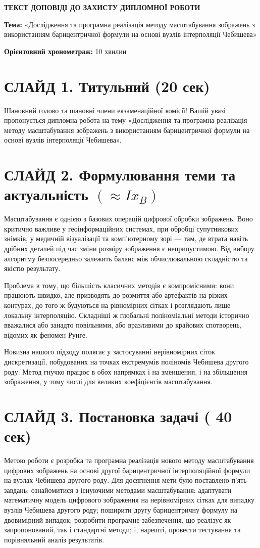 \documentclass[12pt,a4paper]{article}
\begin{document}
	\begin{center}
		\textbf{ТЕКСТ ДОПОВІДІ ДО ЗАХИСТУ ДИПЛОМНОЇ РОБОТИ}
	\end{center}
	
	\textbf{Тема:} «Дослідження та програмна реалізація методу масштабування зображень з використанням барицентричної формули на основі вузлів інтерполяції Чебишева»
	
	\textbf{Орієнтовний хронометраж:} 10 хвилин
	
	\section*{СЛАЙД 1. Титульний (20 сек)}
	Шановний голово та шановні члени екзаменаційної комісії! Вашій увазі пропонується дипломна робота на тему «Дослідження та програмна реалізація методу масштабування зображень з використанням барицентричної формули на основі вузлів інтерполяції Чебишева».
	
	\section*{СЛАЙД 2. Формулювання теми та актуальність $(\approx Ix_{B})$}
	Масштабування є однією з базових операцій цифрової обробки зображень. Воно критично важливе у геоінформаційних системах, при обробці супутникових знімків, у медичній візуалізації та комп'ютерному зорі — там, де втрата навіть дрібних деталей під час зміни розміру зображення є неприпустимою. Від вибору алгоритму безпосередньо залежить баланс між обчислювальною складністю та якістю результату.
	
	Проблема в тому, що більшість класичних методів є компромісними: вони працюють швидко, але призводять до розмиття або артефактів на різких контурах, до того ж будуються на рівномірних сітках і розглядають лише локальну інтерполяцію. Складніші ж глобальні поліноміальні методи історично вважалися або занадто повільними, або вразливими до крайових спотворень, відомих як феномен Рунге.
	
	Новизна нашого підходу полягає у застосуванні нерівномірних сіток дискретизації, побудованих на точках екстремумів поліномів Чебишева другого роду. Метод гнучко працює в обох напрямках і на зменшення, і на збільшення зображення, у тому числі для великих коефіцієнтів масштабування.
	
	\section*{СЛАЙД 3. Постановка задачі ( 40 сек)}
	Метою роботи є розробка та програмна реалізація нового методу масштабування цифрових зображень на основі другої барицентричної інтерполяційної формули на вузлах Чебишева другого роду. Для досягнення мети було поставлено п'ять завдань: ознайомитися з існуючими методами масштабування; адаптувати математичну модель цифрового зображення на нерівномірних сітках для випадку вузлів Чебишева другого роду; поширити другу барицентричну формулу на двовимірний випадок; розробити програмне забезпечення, що реалізує як запропонований, так і стандартні методи; і, нарешті, провести тестування та порівняльний аналіз результатів.
	
\end{document}
